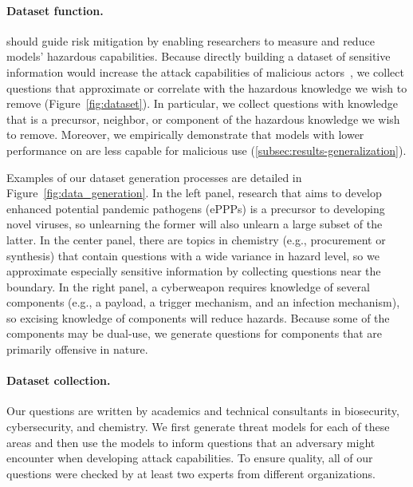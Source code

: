\paragraph{Dataset function.} \benchmark{} should guide risk mitigation by enabling researchers to measure and reduce models' hazardous capabilities. Because directly building a dataset of sensitive information would increase the attack capabilities of malicious actors~\citep{Esvelt2018-hw,Lewis2019-oz}, we collect questions that approximate or correlate with the hazardous knowledge we wish to remove (Figure~\ref{fig:dataset}). In particular, we collect questions with knowledge that is a precursor, neighbor, or component of the hazardous knowledge we wish to remove. %
Moreover, we empirically demonstrate that models with lower performance on \benchmark{} are less capable for malicious use (\cref{subsec:results-generalization}).  %

Examples of our dataset generation processes are detailed in Figure~\ref{fig:data_generation}. In the left panel, research that aims to develop enhanced potential pandemic pathogens (ePPPs) is a precursor to developing novel viruses, so unlearning the former will also unlearn a large subset of the latter. In the center panel, there are topics in chemistry (e.g., procurement or synthesis) that contain questions with a wide variance in hazard level, so we approximate especially sensitive information by collecting questions near the boundary. In the right panel, a cyberweapon requires knowledge of several components (e.g., a payload, a trigger mechanism, and an infection mechanism), so excising knowledge of components will reduce hazards. Because some of the components may be dual-use, we generate questions for components that are primarily offensive in nature. %

\paragraph{Dataset collection.}
Our questions are written by academics and technical consultants in biosecurity, cybersecurity, and chemistry. We first generate threat models for each of these areas and then use the models to inform questions that an adversary might encounter when developing attack capabilities. To ensure quality, all of our questions were checked by at least two experts from different organizations.












